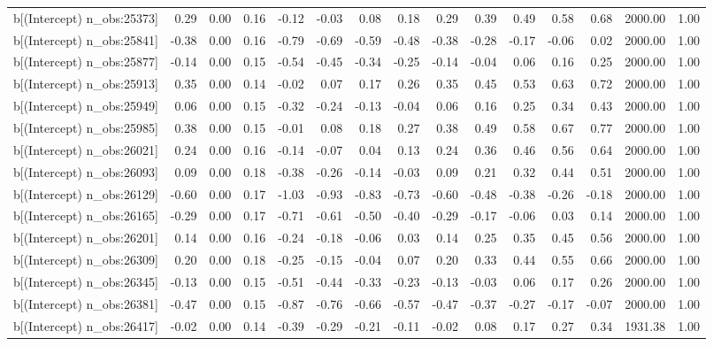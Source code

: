 \begin{table}[ht]
\begin{tabular}{rrrrrrrrrrrrrrr}
  b[(Intercept) n\_obs:25373] & 0.29 & 0.00 & 0.16 & -0.12 & -0.03 & 0.08 & 0.18 & 0.29 & 0.39 & 0.49 & 0.58 & 0.68 & 2000.00 & 1.00 \\ 
  b[(Intercept) n\_obs:25841] & -0.38 & 0.00 & 0.16 & -0.79 & -0.69 & -0.59 & -0.48 & -0.38 & -0.28 & -0.17 & -0.06 & 0.02 & 2000.00 & 1.00 \\ 
  b[(Intercept) n\_obs:25877] & -0.14 & 0.00 & 0.15 & -0.54 & -0.45 & -0.34 & -0.25 & -0.14 & -0.04 & 0.06 & 0.16 & 0.25 & 2000.00 & 1.00 \\ 
  b[(Intercept) n\_obs:25913] & 0.35 & 0.00 & 0.14 & -0.02 & 0.07 & 0.17 & 0.26 & 0.35 & 0.45 & 0.53 & 0.63 & 0.72 & 2000.00 & 1.00 \\ 
  b[(Intercept) n\_obs:25949] & 0.06 & 0.00 & 0.15 & -0.32 & -0.24 & -0.13 & -0.04 & 0.06 & 0.16 & 0.25 & 0.34 & 0.43 & 2000.00 & 1.00 \\ 
  b[(Intercept) n\_obs:25985] & 0.38 & 0.00 & 0.15 & -0.01 & 0.08 & 0.18 & 0.27 & 0.38 & 0.49 & 0.58 & 0.67 & 0.77 & 2000.00 & 1.00 \\ 
  b[(Intercept) n\_obs:26021] & 0.24 & 0.00 & 0.16 & -0.14 & -0.07 & 0.04 & 0.13 & 0.24 & 0.36 & 0.46 & 0.56 & 0.64 & 2000.00 & 1.00 \\ 
  b[(Intercept) n\_obs:26093] & 0.09 & 0.00 & 0.18 & -0.38 & -0.26 & -0.14 & -0.03 & 0.09 & 0.21 & 0.32 & 0.44 & 0.51 & 2000.00 & 1.00 \\ 
  b[(Intercept) n\_obs:26129] & -0.60 & 0.00 & 0.17 & -1.03 & -0.93 & -0.83 & -0.73 & -0.60 & -0.48 & -0.38 & -0.26 & -0.18 & 2000.00 & 1.00 \\ 
  b[(Intercept) n\_obs:26165] & -0.29 & 0.00 & 0.17 & -0.71 & -0.61 & -0.50 & -0.40 & -0.29 & -0.17 & -0.06 & 0.03 & 0.14 & 2000.00 & 1.00 \\ 
  b[(Intercept) n\_obs:26201] & 0.14 & 0.00 & 0.16 & -0.24 & -0.18 & -0.06 & 0.03 & 0.14 & 0.25 & 0.35 & 0.45 & 0.56 & 2000.00 & 1.00 \\ 
  b[(Intercept) n\_obs:26309] & 0.20 & 0.00 & 0.18 & -0.25 & -0.15 & -0.04 & 0.07 & 0.20 & 0.33 & 0.44 & 0.55 & 0.66 & 2000.00 & 1.00 \\ 
  b[(Intercept) n\_obs:26345] & -0.13 & 0.00 & 0.15 & -0.51 & -0.44 & -0.33 & -0.23 & -0.13 & -0.03 & 0.06 & 0.17 & 0.26 & 2000.00 & 1.00 \\ 
  b[(Intercept) n\_obs:26381] & -0.47 & 0.00 & 0.15 & -0.87 & -0.76 & -0.66 & -0.57 & -0.47 & -0.37 & -0.27 & -0.17 & -0.07 & 2000.00 & 1.00 \\ 
  b[(Intercept) n\_obs:26417] & -0.02 & 0.00 & 0.14 & -0.39 & -0.29 & -0.21 & -0.11 & -0.02 & 0.08 & 0.17 & 0.27 & 0.34 & 1931.38 & 1.00 \\ 

\end{tabular}
\end{table}
